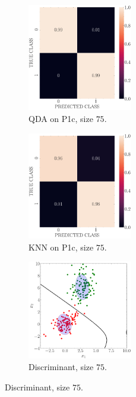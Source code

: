 \documentclass[11pt, a4 paper]{article}
\begin{document}
\begin{figure}[!htbp]
\quad    
    \begin{subfigure}[!htbp]{0.24\textwidth}
       \centering
       \includegraphics[width=1.8in]{../results/ex1/conf_mtx_QD_ML_dataset_P1c_size_75.pdf}
       \caption{QDA on P1c, size $75$.}
       \label{fig:KNN_P1c_75}
    \end{subfigure}
\quad    
    \begin{subfigure}[!htbp]{0.24\textwidth}
       \centering
       \includegraphics[width=1.8in]{../results/ex1/conf_mtx_KNN_dataset_P1c_size_75.pdf}
       \caption{KNN on P1c, size $75$.}
       \label{fig:KNN_P1c_75}
    \end{subfigure}
\quad
    \begin{subfigure}[!htbp]{0.24\textwidth}
       \centering
       \includegraphics[width=1.8in]{../results/ex1/samples_QD_ML_dataset_P1c_size_75.pdf}
       \caption{Discriminant, size $75$.}
       \label{fig:KNN_P1c_75}
    \end{subfigure}
    

\end{figure}
\end{document}
